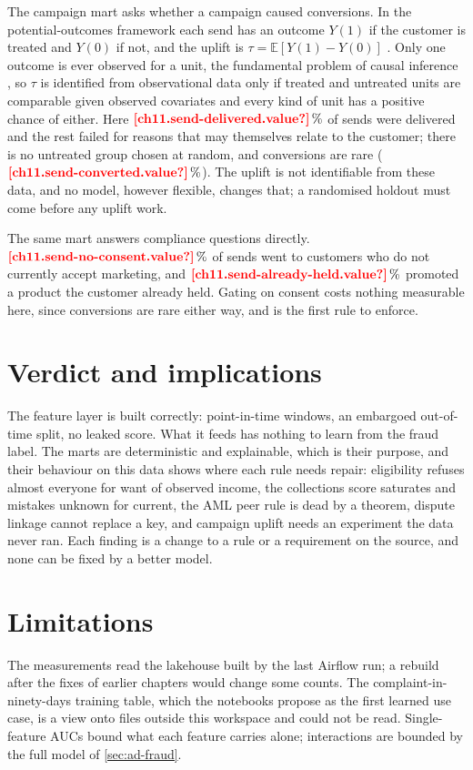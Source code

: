The campaign mart asks whether a campaign caused conversions. In the potential-outcomes framework each send has an outcome
$Y(1)$ if the customer is treated and $Y(0)$ if not, and the uplift is $\tau = \mathbb{E}[Y(1) - Y(0)]$
\autocite{rubin1974}. Only one outcome is ever observed for a unit, the fundamental problem of causal inference
\autocite{holland1986}, so $\tau$ is identified from observational data only if treated and untreated units are comparable
given observed covariates and every kind of unit has a positive chance of either. Here $\est{ch11.send-delivered}{value}\,\%$
of sends were delivered and the rest failed for reasons that may themselves relate to the customer; there is no untreated
group chosen at random, and conversions are rare ($\est{ch11.send-converted}{value}\,\%$). The uplift is not identifiable from
these data, and no model, however flexible, changes that; a randomised holdout must come before any uplift work.

The same mart answers compliance questions directly. $\est{ch11.send-no-consent}{value}\,\%$ of sends went to customers who do
not currently accept marketing, and $\est{ch11.send-already-held}{value}\,\%$ promoted a product the customer already held.
Gating on consent costs nothing measurable here, since conversions are rare either way, and is the first rule to enforce.

\section{Verdict and implications}\label{sec:mf-verdict}

The feature layer is built correctly: point-in-time windows, an embargoed out-of-time split, no leaked score. What it
feeds has nothing to learn from the fraud label. The marts are deterministic and explainable, which is their purpose, and
their behaviour on this data shows where each rule needs repair: eligibility refuses almost everyone for want of observed
income, the collections score saturates and mistakes unknown for current, the AML peer rule is dead by a theorem, dispute
linkage cannot replace a key, and campaign uplift needs an experiment the data never ran. Each finding is a change to a
rule or a requirement on the source, and none can be fixed by a better model.

\section{Limitations}\label{sec:mf-limits}

The measurements read the lakehouse built by the last Airflow run; a rebuild after the fixes of earlier chapters would
change some counts. The complaint-in-ninety-days training table, which the notebooks propose as the first learned use case,
is a view onto files outside this workspace and could not be read. Single-feature AUCs bound what each feature carries
alone; interactions are bounded by the full model of \cref{sec:ad-fraud}.
